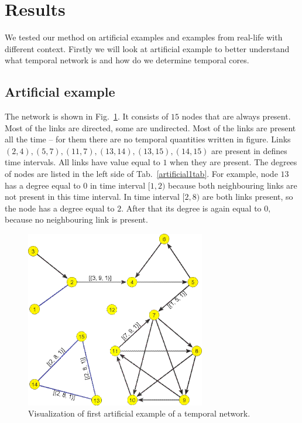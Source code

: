 \documentclass[a4paper,twoside,10pt]{article}
\begin{document}
%
%
\section{Results}\label{rez}

We tested our method on artificial examples and examples from real-life with different context. Firstly we will look at artificial example to better understand what temporal network is and how do we determine temporal cores. 

\subsection{Artificial example}

The network is shown in Fig.~\ref{artificial1}. It consists of $15$ nodes that are always present. Most of the links are directed, some are undirected. Most of the links are present all the time -- for them there are no temporal quantities written in figure. Links $(2,4), (5,7), (11,7), (13,14), (13,15), (14,15)$ are present in defines time intervals. All links have value equal to $1$ when they are present. The degrees of nodes are listed in the left side of Tab.~\ref{artificial1tab}. For example, node $13$ has a degree equal to $0$ in time interval $[1,2)$ because both neighbouring links are not present in this time interval. In time interval $[2,8)$ are both links present, so the node has a degree equal to $2.$ After that its degree is again equal to $0,$ because no neighbouring link is present.

\begin{figure}[!h]
	\centering
	\includegraphics[width=0.7\textwidth]{./pics/Fig5.png}
  \caption{Visualization of first artificial example of a temporal network.}
  \label{artificial1}
\end{figure}
\end{document}
